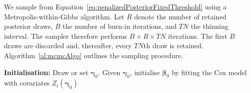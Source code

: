 We sample from Equation~\ref{eq:penalizedPosteriorFixedThreshold} using a
Metropolis-within-Gibbs algorithm. Let $R$ denote the number of retained
posterior draws, $B$ the number of burn-in iterations, and $TN$ the thinning
interval. The sampler therefore performs $B+R\times TN$ iterations. The first
$B$ draws are discarded and, thereafter, every $TN$th draw is retained.
Algorithm~\ref{al:mcmcAlgo} outlines the sampling procedure.

\begin{algorithm}[p]
\large
\SetAlgoLined
\DontPrintSemicolon

\textbf{Initialisation:}
Draw or set $\boldsymbol\gamma_0$. Given $\boldsymbol\gamma_0$, initialise
$\boldsymbol\beta_0$ by fitting the Cox model with covariates
$Z_i(\boldsymbol\gamma_0)$\;

\end{algorithm}
